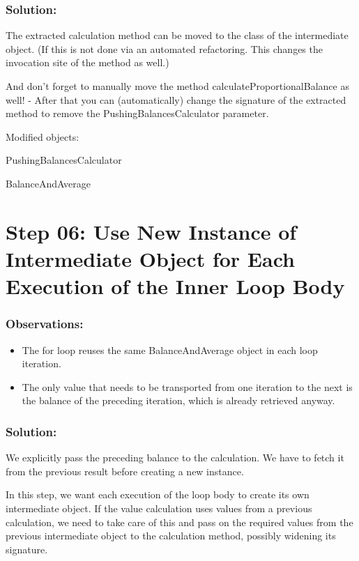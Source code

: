 \documentclass[a4paper,fleqn,titlepage,11pt]{article}
\begin{document}
\subsubsection*{Solution:}

The extracted calculation method can be moved to the class of the intermediate object. (If this is not done via an automated refactoring. This changes the invocation site of the method as well.)

And don't forget to manually move the method calculateProportionalBalance as well! - After that you can (automatically) change the signature of the extracted method to remove the PushingBalancesCalculator parameter.

Modified objects:

PushingBalancesCalculator

BalanceAndAverage


\section*{Step 06: Use New Instance of Intermediate Object for Each Execution of the Inner Loop Body}

\subsubsection*{Observations:}
\begin{itemize}
\item The for loop reuses the same BalanceAndAverage object in each loop iteration.
\item The only value that needs to be transported from one iteration to the next is the balance of the preceding iteration, which is already retrieved anyway.
\end{itemize}

\subsubsection*{Solution:}

We explicitly pass the preceding balance to the calculation. We have to fetch it from the previous result before creating a new instance.

In this step, we want each execution of the loop body to create its own intermediate object. If the value calculation uses values from a previous calculation, we need to take care of this and pass on the required values from the previous intermediate object to the calculation method, possibly widening its signature.
\end{document}
